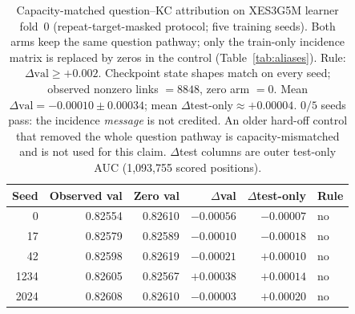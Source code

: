 \begin{table}[H]
\caption{Capacity-matched question--KC attribution on XES3G5M learner
fold~0 (repeat-target-masked protocol; five training seeds). Both arms
keep the same question pathway; only the train-only incidence matrix is
replaced by zeros in the control (Table~\ref{tab:aliases}). Rule:
$\Delta\mathrm{val}\ge{+}0.002$. Checkpoint state shapes match on every
seed; observed nonzero links $=8848$, zero arm $=0$. Mean
$\Delta\mathrm{val}{=}{-}0.00010{\pm}0.00034$; mean
$\Delta\mathrm{test\text{-}only}{\approx}{+}0.00004$. $0/5$ seeds pass: the
incidence \emph{message} is not credited. An older hard-off control that
removed the whole question pathway is capacity-mismatched and is not
used for this claim. $\Delta$test columns are outer
test-only AUC (1{,}093{,}755 scored positions).}
\label{tab:qkc-capacity}
\centering
\footnotesize
\begin{tabular}{@{}rrrrrl@{}}
\toprule
Seed & Observed val & Zero val & $\Delta$val & $\Delta$test-only & Rule \\
\midrule
0 & 0.82554 & 0.82610 & $-0.00056$ & $-0.00007$ & no \\
17 & 0.82579 & 0.82589 & $-0.00010$ & $-0.00018$ & no \\
42 & 0.82598 & 0.82619 & $-0.00021$ & $+0.00010$ & no \\
1234 & 0.82605 & 0.82567 & $+0.00038$ & $+0.00014$ & no \\
2024 & 0.82608 & 0.82610 & $-0.00003$ & $+0.00020$ & no \\
\bottomrule
\end{tabular}
\end{table}
